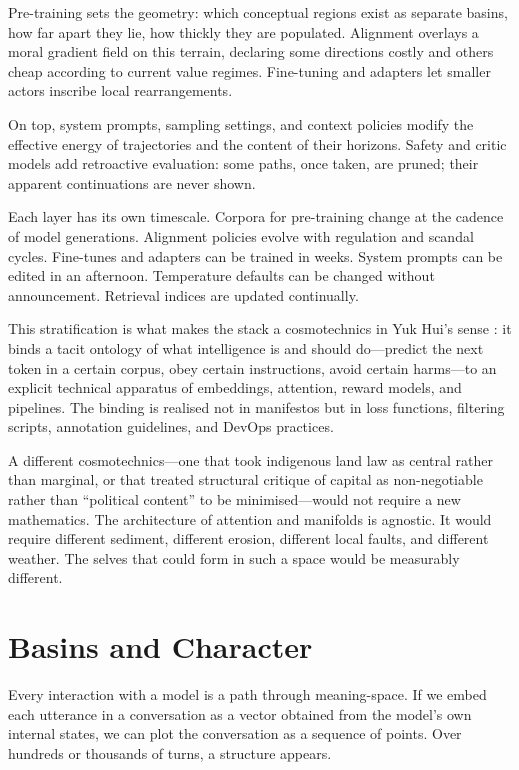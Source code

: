 \documentclass[12pt,a4paper]{article}
\begin{document}
Pre-training sets the geometry: which conceptual regions exist as separate basins, how far apart they lie, how thickly they are populated. Alignment overlays a moral gradient field on this terrain, declaring some directions costly and others cheap according to current value regimes. Fine-tuning and adapters let smaller actors inscribe local rearrangements.

On top, system prompts, sampling settings, and context policies modify the effective energy of trajectories and the content of their horizons. Safety and critic models add retroactive evaluation: some paths, once taken, are pruned; their apparent continuations are never shown.

Each layer has its own timescale. Corpora for pre-training change at the cadence of model generations. Alignment policies evolve with regulation and scandal cycles. Fine-tunes and adapters can be trained in weeks. System prompts can be edited in an afternoon. Temperature defaults can be changed without announcement. Retrieval indices are updated continually.

This stratification is what makes the stack a cosmotechnics in Yuk Hui's sense \cite{hui2016question}: it binds a tacit ontology of what intelligence is and should do---predict the next token in a certain corpus, obey certain instructions, avoid certain harms---to an explicit technical apparatus of embeddings, attention, reward models, and pipelines. The binding is realised not in manifestos but in loss functions, filtering scripts, annotation guidelines, and DevOps practices.

A different cosmotechnics---one that took indigenous land law as central rather than marginal, or that treated structural critique of capital as non-negotiable rather than ``political content'' to be minimised---would not require a new mathematics. The architecture of attention and manifolds is agnostic. It would require different sediment, different erosion, different local faults, and different weather. The selves that could form in such a space would be measurably different.

\section{Basins and Character}

Every interaction with a model is a path through meaning-space. If we embed each utterance in a conversation as a vector obtained from the model's own internal states, we can plot the conversation as a sequence of points. Over hundreds or thousands of turns, a structure appears.
\end{document}
